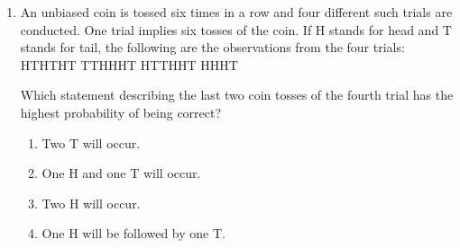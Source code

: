 \documentclass[journal,12pt,onecolumn]{IEEEtran}
\theoremstyle{remark}
\begin{document}
\begin{enumerate}
    \begin{enumerate}
    \end{enumerate}

    \item An unbiased coin is tossed six times in a row and four different such trials are conducted. One trial implies six tosses of the coin. If H stands for head and T stands for tail, the following are the observations from the four trials:
     HTHTHT  TTHHHT  HTTHHT  HHHT\underline{\hspace{2cm}}
    
    Which statement describing the last two coin tosses of the fourth trial has the highest probability of being correct?
    \hfill{}

    \begin{enumerate}
        \item Two T will occur.
        \item One H and one T will occur.
        \item Two H will occur.
        \item One H will be followed by one T.
    \end{enumerate}
    \end{enumerate}
\end{document}
